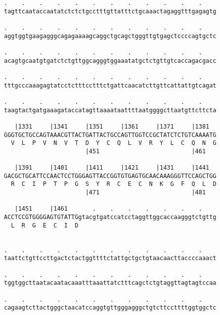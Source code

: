 \documentclass{article}
\begin{document}
\begin{Verbatim}
.    .    .    .    .    .    .    .    .    .    .    .    
tagttcaataccaatatctctctgcctttgttatttctgcaaactagaggtttgagagtg
                                                            
.    .    .    .    .    .    .    .    .    .    .    .    
aggtggtgaagagggcagagaaaagcaggctgcagctgggttgtgagctccccagtgctc
                                                            
.    .    .    .    .    .    .    .    .    .    .    .    
acagtgcaatgtgatctctgttggcagggtggaaatatgctctgttgtcaccagacgacc
                                                            
.    .    .    .    .    .    .    .    .    .    .    .    
tttgcccaaagagtatcctctttcctttctgattcaacatcttgttcattattgtcagat
                                                            
.    .    .    .    .    .    .    .    .    .    .    .    
taagtactgatgaaagataccatagttaaaataattttaatggggcttaatgttcttcta
                                                            
   |1331     |1341     |1351     |1361     |1371     |1381  
GGGTGCTGCCAGTAAACGTTACTGATTACTGCCAGTTGGTCCGCTATCTCTGTCAAAATG
  V  L  P  V  N  V  T  D  Y  C  Q  L  V  R  Y  L  C  Q  N  G
                       |451                          |461   
  
   |1391     |1401     |1411     |1421     |1431     |1441  
GACGCTGCATTCCAACTCCTGGGAGTTACCGGTGTGAGTGCAACAAAGGGTTCCAGCTGG
  R  C  I  P  T  P  G  S  Y  R  C  E  C  N  K  G  F  Q  L  D
                       |471                          |481   
  
   |1451     |1461       .    .    .    .    .    .    .    
ACCTCCGTGGGGAGTGTATTGgtacgtgatccatcctaggttggcaccaagggtctgttg
  L  R  G  E  C  I  D                                       
                                                            
  
.    .    .    .    .    .    .    .    .    .    .    .    
taattctgttccttgactctactggttttctattgctgctgtaacaacttaccccaaact
                                                            
.    .    .    .    .    .    .    .    .    .    .    .    
tggtggcttaatacaatacaaatttaaattatctttcagctctgtaggttagtagtccaa
                                                            
.    .    .    .    .    .    .    .    .    .    .    .    
cagaagtcttactgggctaacatccaggtgttgggagggctgtcttccttttggtggctc
                                                            

\end{Verbatim}
\end{document}
